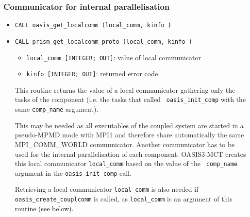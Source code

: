 \subsubsection{Communicator for internal parallelisation}
\label{subsec_MPI1}

\begin{itemize}
\item {\tt CALL oasis\_get\_localcomm (local\_comm, kinfo )}
\item {\tt CALL prism\_get\_localcomm\_proto (local\_comm, kinfo )}

  \begin{itemize}
  \item {\tt local\_comm [INTEGER; OUT]}: value of local communicator
  \item {\tt kinfo [INTEGER; OUT]}: returned error code.
  \end{itemize}

  This routine returns the value of a local communicator gathering
  only the tasks of the component (i.e. the tasks that called {\tt
  oasis\_init\_comp} with the same {\tt comp\_name}
argument).

  This may be needed as all executables of the coupled system are started in a pseudo-MPMD
  mode with MPI1 and therefore share automatically the same MPI\_COMM\_WORLD
  communicator.  Another communicator has to be used for the internal
  parallelisation of each component. OASIS3-MCT creates this local
  communicator {\tt local\_comm} based on the value of the {\tt
    comp\_name} argument in the {\tt oasis\_init\_comp} call.

  Retrieving a local communicator {\tt local\_comm} is also needed if
  {\tt oasis\_create\_couplcomm} is called, as {\tt local\_comm} is an argument of this routine (see below).

\end{itemize}

